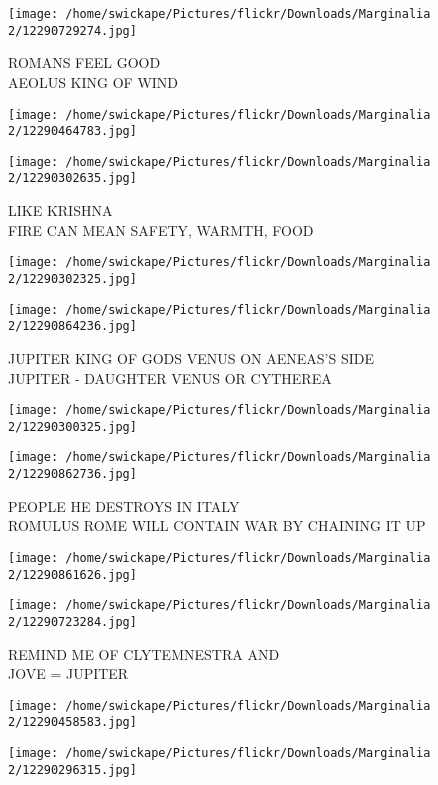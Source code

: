 \documentclass[10pt,letterpaper]{article}
\begin{document}
\vspace{0.25in}
\texttt{[image: /home/swickape/Pictures/flickr/Downloads/Marginalia 2/12290729274.jpg]}

ROMANS FEEL GOOD\\
AEOLUS KING OF WIND
\pagebreak

\texttt{[image: /home/swickape/Pictures/flickr/Downloads/Marginalia 2/12290464783.jpg]}

\vspace{0.25in}
\texttt{[image: /home/swickape/Pictures/flickr/Downloads/Marginalia 2/12290302635.jpg]}

LIKE KRISHNA\\
FIRE CAN MEAN SAFETY, WARMTH, FOOD
\pagebreak

\texttt{[image: /home/swickape/Pictures/flickr/Downloads/Marginalia 2/12290302325.jpg]}

\vspace{0.25in}
\texttt{[image: /home/swickape/Pictures/flickr/Downloads/Marginalia 2/12290864236.jpg]}

JUPITER KING OF GODS VENUS ON AENEAS'S SIDE\\
JUPITER {-} DAUGHTER VENUS OR CYTHEREA
\pagebreak

\texttt{[image: /home/swickape/Pictures/flickr/Downloads/Marginalia 2/12290300325.jpg]}

\vspace{0.25in}
\texttt{[image: /home/swickape/Pictures/flickr/Downloads/Marginalia 2/12290862736.jpg]}

PEOPLE HE DESTROYS IN ITALY\\
ROMULUS ROME WILL CONTAIN WAR BY CHAINING IT UP
\pagebreak

\texttt{[image: /home/swickape/Pictures/flickr/Downloads/Marginalia 2/12290861626.jpg]}

\vspace{0.25in}
\texttt{[image: /home/swickape/Pictures/flickr/Downloads/Marginalia 2/12290723284.jpg]}

REMIND ME OF CLYTEMNESTRA AND\\
JOVE = JUPITER
\pagebreak

\texttt{[image: /home/swickape/Pictures/flickr/Downloads/Marginalia 2/12290458583.jpg]}

\vspace{0.25in}
\texttt{[image: /home/swickape/Pictures/flickr/Downloads/Marginalia 2/12290296315.jpg]}
\end{document}
